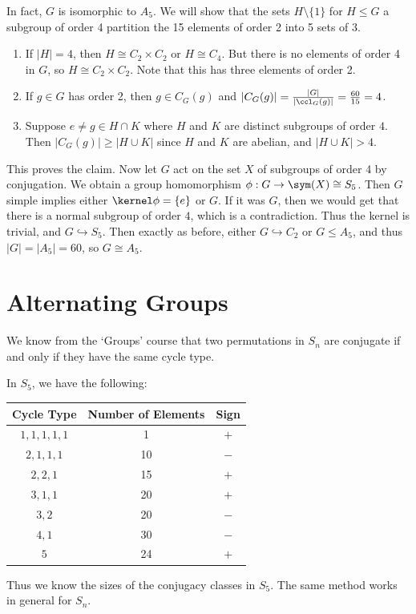 \begin{example}
In fact, $G$ is isomorphic to $A_5$. We will show that the sets $H \setminus \{1\}$ for $H \leq G$ a subgroup of order 4 partition the 15 elements of order 2 into 5 sets of 3.
\begin{enumerate}
	\item If $|H| = 4$, then $H \cong C_2 \times C_2$ or $H \cong C_4$. But there is no elements of order 4 in $G$, so $H \cong C_2 \times C_2$. Note that this has three elements of order 2.
	\item If $g \in G$ has order 2, then $g \in C_G(g)$ and $|C_G(g)| = \frac{|G|}{|\ccl_G(g)|} = \frac{60}{15} = 4$.
	\item Suppose $e \neq g \in H \cap K$ where $H$ and $K$ are distinct subgroups of order $4$. Then $|C_G(g)| \geq |H \cup K|$ since $H$ and $K$ are abelian, and $|H \cup K| > 4$.
\end{enumerate}
This proves the claim. Now let $G$ act on the set $X$ of subgroups of order 4 by conjugation. We obtain a group homomorphism $\phi:G \rightarrow \sym(X) \cong S_5$. Then $G$ simple implies either $\kernel \phi = \{e\}$ or $G$. If it was $G$, then we would get that there is a normal subgroup of order $4$, which is a contradiction. Thus the kernel is trivial, and $G \hookrightarrow S_5$. Then exactly as before, either $G \hookrightarrow C_2$ or $G \leq A_5$, and thus $|G| = |A_5| = 60$, so $G \cong A_5$.
\end{example}

\section{Alternating Groups}

We know from the `Groups' course that two permutations in $S_n$ are conjugate if and only if they have the same cycle type.

\begin{example}
	In $S_5$, we have the following:
	\begin{center}
		\begin{tabular}{@{}ccc@{}}
			\toprule
			Cycle Type    & Number of Elements & Sign \\ \midrule
			$1, 1, 1, 1, 1$  & 1   &   $+$  \\ 
			$2, 1, 1, 1$  & 10   &   $-$  \\
			$2, 2, 1$  & 15   &   $+$  \\
			$3, 1, 1$  & 20   &   $+$  \\
			$3, 2$  & 20   &   $-$  \\
			$4, 1$  & 30   &   $-$  \\
			$5$  & 24   &   $+$  \\
			\bottomrule
			\end{tabular}
	\end{center}
	Thus we know the sizes of the conjugacy classes in $S_5$. The same method works in general for $S_n$.
\end{example}

